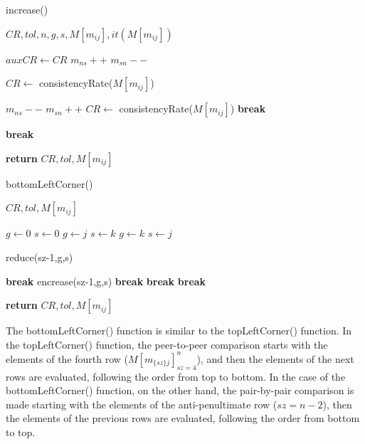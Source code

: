 \documentclass[10pt,fleqn,a4paper,twoside]{article}
\begin{document}
\begin{algorithm}
\caption{increase()}\label{alg:increase}
	\begin{algorithmic}
	\Require $CR, tol, n, g, s, M[m_{ij}], it(M[m_{ij}])$
	
		\State $auxCR \gets CR$
		\State $m_{ns} ++$
		\State $m_{sn} --$
		
		\State $CR \gets$ consistencyRate($M[m_{ij}]$)
		
			\State $m_{ns} --$
			\State $m_{sn} ++$
			\State $CR \gets$ consistencyRate($M[m_{ij}]$)
			\State \textbf{break}
			
			\State \textbf{break}
		\EndIf
\EndWhile

\State \textbf{return} $CR, tol, M[m_{ij}]$	
	
\end{algorithmic}
\end{algorithm}

\begin{algorithm}
\caption{bottomLeftCorner()}\label{alg:bottomLeftCorner}
	\begin{algorithmic}
	\Require $CR, tol, M[m_{ij}]$
	
						\State $g \gets 0$
						\State $s \gets 0$
							\State $g \gets j$
							\State $s \gets k$
							\State $g \gets k$
							\State $s \gets j$
						\EndIf
					
						
							\State reduce(sz-1,g,s)
						
								\State \textbf{break}
								encrease(sz-1,g,s)
									\State \textbf{break}
								\EndIf
							\EndIf
						\EndIf
					\EndIf
				\EndFor
					\State \textbf{break}
				\EndIf
			\EndFor
					\State \textbf{break}
				\EndIf	
		\EndFor
	\EndIf
	
	\State \textbf{return} $CR, tol, M[m_{ij}]$

\end{algorithmic}
\end{algorithm}

The bottomLeftCorner() function is similar to the topLeftCorner() function. In the topLeftCorner() function, the peer-to-peer comparison starts with the elements of the fourth row ($M[m_{\{sz\}j}]_{sz=4}^{n}$), and then the elements of the next rows are evaluated, following the order from top to bottom. In the case of the bottomLeftCorner() function, on the other hand, the pair-by-pair comparison is made starting with the elements of the anti-penultimate row ($sz = n-2$), then the elements of the previous rows are evaluated, following the order from bottom to top.
    
\end{document}
